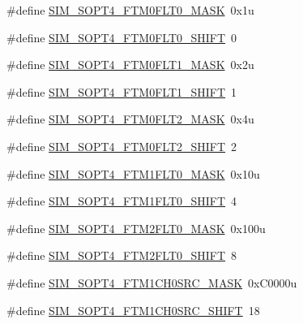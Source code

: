 \begin{DoxyCompactItemize}
\item 
\#define \hyperlink{group___s_i_m___register___masks_gaa868cd9e56dc4f0280f6d1866da1ac57}{S\+I\+M\+\_\+\+S\+O\+P\+T4\+\_\+\+F\+T\+M0\+F\+L\+T0\+\_\+\+M\+A\+SK}~0x1u
\item 
\#define \hyperlink{group___s_i_m___register___masks_gafc9e6a78afb92b0ff8189d6bc30c39ce}{S\+I\+M\+\_\+\+S\+O\+P\+T4\+\_\+\+F\+T\+M0\+F\+L\+T0\+\_\+\+S\+H\+I\+FT}~0
\item 
\#define \hyperlink{group___s_i_m___register___masks_gaa42586e5889050292d5e70bf2d1aea2d}{S\+I\+M\+\_\+\+S\+O\+P\+T4\+\_\+\+F\+T\+M0\+F\+L\+T1\+\_\+\+M\+A\+SK}~0x2u
\item 
\#define \hyperlink{group___s_i_m___register___masks_gaf503fb0314431593f41ebe5fa4b83851}{S\+I\+M\+\_\+\+S\+O\+P\+T4\+\_\+\+F\+T\+M0\+F\+L\+T1\+\_\+\+S\+H\+I\+FT}~1
\item 
\#define \hyperlink{group___s_i_m___register___masks_gafa0c4deac7488857fd22e28602b612fb}{S\+I\+M\+\_\+\+S\+O\+P\+T4\+\_\+\+F\+T\+M0\+F\+L\+T2\+\_\+\+M\+A\+SK}~0x4u
\item 
\#define \hyperlink{group___s_i_m___register___masks_gacca0c622cfa1e0c7e7214096c38c6557}{S\+I\+M\+\_\+\+S\+O\+P\+T4\+\_\+\+F\+T\+M0\+F\+L\+T2\+\_\+\+S\+H\+I\+FT}~2
\item 
\#define \hyperlink{group___s_i_m___register___masks_ga605f729e3f4faddc18e957c077adf61a}{S\+I\+M\+\_\+\+S\+O\+P\+T4\+\_\+\+F\+T\+M1\+F\+L\+T0\+\_\+\+M\+A\+SK}~0x10u
\item 
\#define \hyperlink{group___s_i_m___register___masks_ga9fb8861affd661f64719260a43a87ec6}{S\+I\+M\+\_\+\+S\+O\+P\+T4\+\_\+\+F\+T\+M1\+F\+L\+T0\+\_\+\+S\+H\+I\+FT}~4
\item 
\#define \hyperlink{group___s_i_m___register___masks_ga4f61f56a63a5d239be393708c17cf82c}{S\+I\+M\+\_\+\+S\+O\+P\+T4\+\_\+\+F\+T\+M2\+F\+L\+T0\+\_\+\+M\+A\+SK}~0x100u
\item 
\#define \hyperlink{group___s_i_m___register___masks_ga15275ae91c6efbf697f472b940369401}{S\+I\+M\+\_\+\+S\+O\+P\+T4\+\_\+\+F\+T\+M2\+F\+L\+T0\+\_\+\+S\+H\+I\+FT}~8
\item 
\#define \hyperlink{group___s_i_m___register___masks_ga8be459723f070708becab666dc6abc47}{S\+I\+M\+\_\+\+S\+O\+P\+T4\+\_\+\+F\+T\+M1\+C\+H0\+S\+R\+C\+\_\+\+M\+A\+SK}~0x\+C0000u
\item 
\#define \hyperlink{group___s_i_m___register___masks_gaee4e8fb1805bded49220a407c1620345}{S\+I\+M\+\_\+\+S\+O\+P\+T4\+\_\+\+F\+T\+M1\+C\+H0\+S\+R\+C\+\_\+\+S\+H\+I\+FT}~18
\item 

\end{DoxyCompactItemize}
